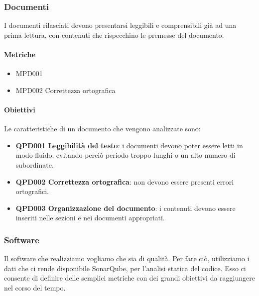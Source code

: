 	\subsubsection{Documenti}
	I documenti rilasciati devono presentarsi leggibili e comprensibili già ad una prima lettura, con contenuti che rispecchino le premesse del documento.

		\paragraph*{Metriche} 
		\begin{itemize}
			\item MPD001 
			\item MPD002 Correttezza ortografica
		\end{itemize} 
		
		\paragraph*{Obiettivi} 		
		Le caratteristiche di un documento che vengono analizzate sono:
		
		\begin{itemize}
			\item \textbf{QPD001 Leggibilità del testo}: i documenti devono poter essere letti in modo fluido, evitando perciò periodo troppo lunghi o un alto numero di subordinate.
			\item \textbf{QPD002 Correttezza ortografica}: non devono essere presenti errori ortografici.
			\item \textbf{QPD003 Organizzazione del documento}: i contenuti devono essere inseriti nelle sezioni e nei documenti appropriati.
		\end{itemize}

	\subsubsection{Software} \label{prodottosw}
	Il software che realizziamo vogliamo che sia di qualità.
	Per fare ciò, utilizziamo i dati che ci rende disponibile SonarQube, per l'analisi statica del codice.
	Esso ci consente di definire delle semplici metriche con dei grandi obiettivi da raggiungere nel corso del tempo.

